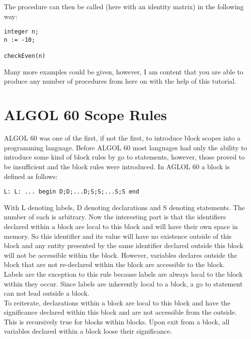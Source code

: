 \documentclass{article}
\begin{document}
The procedure can then be called (here with an identity matrix) in the following way:

\begin{lstlisting}[language={[60]algol}]
integer n;
n := -10;

checkEven(n)
\end{lstlisting}

Many more examples could be given, however, I am content that you are able to produce any number of procedures from here on with the help of this tutorial.

\newpage

\section{ALGOL 60 Scope Rules} \label{scopeRule}
ALGOL 60 was one of the first, if not the first, to introduce block scopes into a programming language. Before ALGOL 60 most languages had only the ability to introduce some kind of block rules by go to statements, however, those proved to be insufficient and the block rules were introduced. In AGLOL 60 a block is defined as follows:

\begin{lstlisting}[language={[60]algol}]
L: L: ... begin D;D;...D;S;S;...S;S end
\end{lstlisting}

With L denoting labels, D denoting declarations and S denoting statements. The number of each is arbitrary. Now the interesting part is that the identifiers declared within a block are local to this block and will have their own space in memory. So this identifier and its value will have no existence outside of this block and any entity presented by the same identifier declared outside this block will not be accessible within the block. However, variables declares outside the block that are not re-declared within the block are accessible to the block. \\

Labels are the exception to this rule because labels are always local to the block within they occur. Since labels are inherently local to a block, a go to statement can not lead outside a block.\\

To reiterate, declarations within a block are local to this block and have the significance declared within this block and are not accessible from the outside. This is recursively true for blocks within blocks. Upon exit from a block, all variables declared within a block loose their significance.\\
\end{document}
